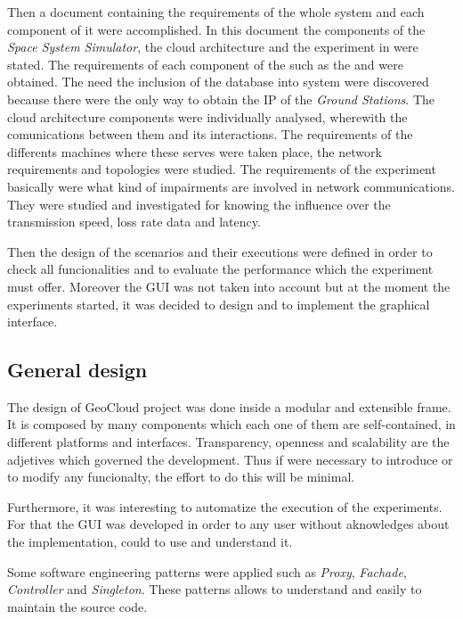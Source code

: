 Then a document containing the requirements of the whole system and each
component of it were accomplished. In this document the components of the
\emph{Space System Simulator},
the cloud architecture and the experiment in \pl were stated. The requirements
of each component of
the \sss such as the \satss and \gsss were obtained. The need the inclusion of
the database into system were discovered because there were the only way to obtain the
\ac{IP} of the \emph{Ground Stations}. The cloud architecture components were
individually analysed, wherewith the comunications between them and its
interactions. The requirements of the differents machines where these serves
were taken place, the network requirements and topologies were studied.  
The requirements of the \pl experiment basically were what kind of impairments
are involved in network communications. They were studied and investigated for
knowing the influence over the transmission speed, loss rate data and latency.

Then the design of the scenarios and their executions were defined in order to
check all funcionalities and to evaluate the performance which the experiment must offer.
Moreover the \ac{GUI} was not taken into account but at the moment the
experiments started, it was decided to design and to implement the graphical interface.


\subsection{General design}

The design of GeoCloud project was done inside a modular and extensible
frame. It is composed by many components which each one of them are
self-contained, in different platforms and interfaces. Transparency, openness
and scalability are the adjetives which governed the development. Thus if were
necessary to introduce or to modify any funcionalty, the effort to do this will
be minimal.

Furthermore, it was interesting to automatize the execution of the
experiments. For that the \ac{GUI} was developed in order to any user without
aknowledges about the implementation, could to use and understand it.

Some software engineering patterns were applied such as \emph{Proxy},
\emph{Fachade}, \emph{Controller} and \emph{Singleton}. These patterns allows to understand and easily to
maintain the source code. 

